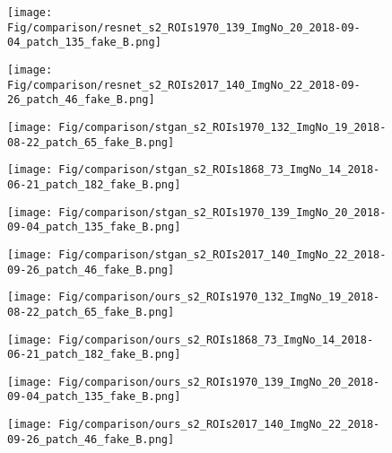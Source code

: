 \documentclass[journal]{IEEEtran}
\begin{document}
\begin{figure*}[h!tb]
  \begin{subfigure}[b]{0.2\linewidth}
    \texttt{[image: Fig/comparison/resnet\_s2\_ROIs1970\_139\_ImgNo\_20\_2018-09-04\_patch\_135\_fake\_B.png]}
  \end{subfigure}
    \begin{subfigure}[b]{0.2\linewidth}
    \texttt{[image: Fig/comparison/resnet\_s2\_ROIs2017\_140\_ImgNo\_22\_2018-09-26\_patch\_46\_fake\_B.png]}
  \end{subfigure}
    \begin{subfigure}[b]{0.2\linewidth}
    \texttt{[image: Fig/comparison/stgan\_s2\_ROIs1970\_132\_ImgNo\_19\_2018-08-22\_patch\_65\_fake\_B.png]}
  \end{subfigure}
  \begin{subfigure}[b]{0.2\linewidth}
    \texttt{[image: Fig/comparison/stgan\_s2\_ROIs1868\_73\_ImgNo\_14\_2018-06-21\_patch\_182\_fake\_B.png]}
  \end{subfigure}   
    \begin{subfigure}[b]{0.2\linewidth}
    \texttt{[image: Fig/comparison/stgan\_s2\_ROIs1970\_139\_ImgNo\_20\_2018-09-04\_patch\_135\_fake\_B.png]}
  \end{subfigure}
      \begin{subfigure}[b]{0.2\linewidth}
    \texttt{[image: Fig/comparison/stgan\_s2\_ROIs2017\_140\_ImgNo\_22\_2018-09-26\_patch\_46\_fake\_B.png]}
  \end{subfigure}
  \begin{subfigure}[b]{0.2\linewidth}
    \texttt{[image: Fig/comparison/ours\_s2\_ROIs1970\_132\_ImgNo\_19\_2018-08-22\_patch\_65\_fake\_B.png]}
  \end{subfigure}
    \begin{subfigure}[b]{0.2\linewidth}
    \texttt{[image: Fig/comparison/ours\_s2\_ROIs1868\_73\_ImgNo\_14\_2018-06-21\_patch\_182\_fake\_B.png]}
  \end{subfigure}
    \begin{subfigure}[b]{0.2\linewidth}
    \texttt{[image: Fig/comparison/ours\_s2\_ROIs1970\_139\_ImgNo\_20\_2018-09-04\_patch\_135\_fake\_B.png]}
  \end{subfigure}
  \begin{subfigure}[b]{0.2\linewidth}
    \texttt{[image: Fig/comparison/ours\_s2\_ROIs2017\_140\_ImgNo\_22\_2018-09-26\_patch\_46\_fake\_B.png]}
  \end{subfigure}   
    \begin{subfigure}[b]{0.2\linewidth}

\end{subfigure}
\end{figure*}
\end{document}

